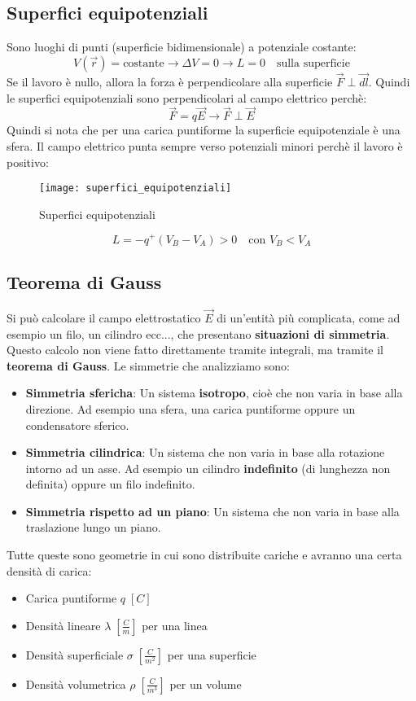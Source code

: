 \documentclass[a4paper]{article}
\begin{document}
\subsection{Superfici equipotenziali}
Sono luoghi di punti (superficie bidimensionale) a potenziale costante:
\[
  V(\vec{r}) = \text{costante} \to \Delta V = 0 \to L = 0 \quad \text{sulla superficie}
\] 
Se il lavoro è nullo, allora la forza è perpendicolare alla superficie \( \vec{F} \perp \vec{dl} \).
Quindi le superfici equipotenziali sono perpendicolari al campo elettrico perchè:
\[
  \vec{F} = q \vec{E} \to \vec{F} \perp \vec{E}
\] 
Quindi si nota che per una carica puntiforme la superficie equipotenziale è una sfera.
Il campo elettrico punta sempre verso potenziali minori perchè il lavoro è positivo:
\begin{figure}[H]
  \centering
  \texttt{[image: superfici\_equipotenziali]}
  \caption{Superfici equipotenziali}
\end{figure}
\[
  L = -q^+ \left( V_B - V_A \right) > 0 \quad \text{con } V_B < V_A
\] 

\subsection{Teorema di Gauss}
Si può calcolare il campo elettrostatico \( \vec{E} \) di un'entità più complicata, come
ad esempio un filo, un cilindro ecc..., che presentano \textbf{situazioni di simmetria}.
Questo calcolo non viene fatto direttamente tramite integrali, ma tramite il \textbf{teorema
di Gauss}. Le simmetrie che analizziamo sono:
\begin{itemize}
  \item \textbf{Simmetria sfericha}: Un sistema \textbf{isotropo}, cioè che non varia in
    base alla direzione. Ad esempio una sfera, una carica puntiforme oppure un
    condensatore sferico.

  \item \textbf{Simmetria cilindrica}: Un sistema che non varia in base alla rotazione 
    intorno ad un asse. Ad esempio un cilindro \textbf{indefinito} (di lunghezza non 
    definita) oppure un filo indefinito.

  \item \textbf{Simmetria rispetto ad un piano}: Un sistema che non varia in base alla 
    traslazione lungo un piano.
\end{itemize}
Tutte queste sono geometrie in cui sono distribuite cariche e avranno una certa densità
di carica:
\begin{itemize}
  \item Carica puntiforme \( q \; \left[ C \right] \)
  \item Densità lineare \( \lambda \; \left[ \frac{C}{m} \right] \) per una linea
  \item Densità superficiale \( \sigma \; \left[ \frac{C}{m^2} \right] \) per una superficie
  \item Densità volumetrica \( \rho \; \left[ \frac{C}{m^3} \right] \) per un volume
\end{itemize}
\end{document}
